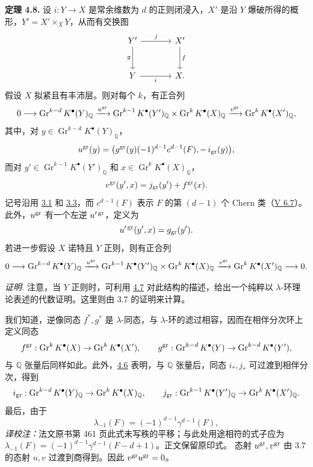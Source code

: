 \textbf{定理 4.8.} 设 \(i:Y\to X\) 是常余维数为 \(d\) 的正则闭浸入，\(X'\) 是沿 \(Y\) 爆破所得的概形，\(Y'=X'\times_XY\)，从而有交换图
\[
\begin{tikzcd}[column sep=large,row sep=large]
Y' \arrow[r,"j"] \arrow[d,"g"'] & X' \arrow[d,"f"]\\
Y \arrow[r,"i"'] & X.
\end{tikzcd}
\]
假设 \(X\) 拟紧且有丰沛层。则对每个 \(k\)，有正合列
\[
0\longrightarrow
\operatorname{Gr}^{k-d}K^\bullet(Y)_{\mathbb Q}
\xrightarrow{u^{\operatorname{gr}}}
\operatorname{Gr}^{k-1}K^\bullet(Y')_{\mathbb Q}
\times
\operatorname{Gr}^{k}K^\bullet(X)_{\mathbb Q}
\xrightarrow{v^{\operatorname{gr}}}
\operatorname{Gr}^{k}K^\bullet(X')_{\mathbb Q},
\]
其中，对 \(y\in \operatorname{Gr}^{k-d}K^\bullet(Y)_{\mathbb Q}\)，
\[
  u^{\operatorname{gr}}(y)=
  \bigl(g^{\operatorname{gr}}(y)(-1)^{d-1}c^{d-1}(F),-\,i_{\operatorname{gr}}(y)\bigr),
\]
而对 \(y'\in \operatorname{Gr}^{k-1}K^\bullet(Y')_{\mathbb Q}\) 和 \(x\in \operatorname{Gr}^{k}K^\bullet(X)_{\mathbb Q}\)，
\[
  v^{\operatorname{gr}}(y',x)=j_{\operatorname{gr}}(y')+f^{\operatorname{gr}}(x).
\]
记号沿用 \hyperlink{sga6.e07.para.3-1}{3.1} 和 \hyperlink{sga6.e07.para.3-3}{3.3}，而 \(c^{d-1}(F)\) 表示 \(F\) 的第 \((d-1)\) 个 Chern 类（\hyperlink{sga6.e05.para.6-7}{V 6.7}）。此外，\(u^{\operatorname{gr}}\) 有一个左逆 \(u'^{\operatorname{gr}}\)，定义为
\[
  u'^{\operatorname{gr}}(y',x)=g_{\operatorname{gr}}(y').
\]
若进一步假设 \(X\) 诺特且 \(Y\) 正则，则有正合列
\[
0\longrightarrow
\operatorname{Gr}^{k-d}K^\bullet(Y)_{\mathbb Q}
\xrightarrow{u^{\operatorname{gr}}}
\operatorname{Gr}^{k-1}K^\bullet(Y')_{\mathbb Q}
\times
\operatorname{Gr}^{k}K^\bullet(X)_{\mathbb Q}
\xrightarrow{v^{\operatorname{gr}}}
\operatorname{Gr}^{k}K^\bullet(X')_{\mathbb Q}
\longrightarrow0.
\]

\emph{证明.} 注意，当 \(Y\) 正则时，可利用 \hyperlink{sga6.e07.sec.4.7}{4.7} 对此结构的描述，给出一个纯粹以 \(\lambda\)-环理论表述的代数证明。这里则由 3.7 的证明来计算。

我们知道，逆像同态 \(f^*,g^*\) 是 \(\lambda\)-同态，与 \(\lambda\)-环的滤过相容，因而在相伴分次环上定义同态
\[
  f^{\operatorname{gr}}:\operatorname{Gr}^kK^\bullet(X)\to\operatorname{Gr}^kK^\bullet(X'),
  \qquad
  g^{\operatorname{gr}}:\operatorname{Gr}^{k-d}K^\bullet(Y)\to\operatorname{Gr}^{k-d}K^\bullet(Y'),
\]
与 \(\mathbb Q\) 张量后同样如此。此外，\hyperlink{sga6.e07.thm.4-6}{4.6} 表明，与 \(\mathbb Q\) 张量后，同态 \(i_*,j_*\) 可过渡到相伴分次，得到
\[
  i_{\operatorname{gr}}:\operatorname{Gr}^{k-d}K^\bullet(Y)_{\mathbb Q}
  \to \operatorname{Gr}^{k}K^\bullet(X)_{\mathbb Q},
  \qquad
  j_{\operatorname{gr}}:\operatorname{Gr}^{k-1}K^\bullet(Y')_{\mathbb Q}
  \to \operatorname{Gr}^{k}K^\bullet(X')_{\mathbb Q}.
\]
最后，由于
\[
  \lambda_{-1}(F)=(-1)^{d-1}\gamma^{d-1}(F),
\]\noindent\textit{译校注：}法文原书第 461 页此式未写秩的平移；与此处用途相符的式子应为 \(\lambda_{-1}(F)=(-1)^{d-1}\gamma^{d-1}(F-d+1)\)。正文保留原印式。
态射 \(u^{\operatorname{gr}},v^{\operatorname{gr}}\) 由 3.7 的态射 \(u,v\) 过渡到商得到。因此 \(v^{\operatorname{gr}}u^{\operatorname{gr}}=0\)。

